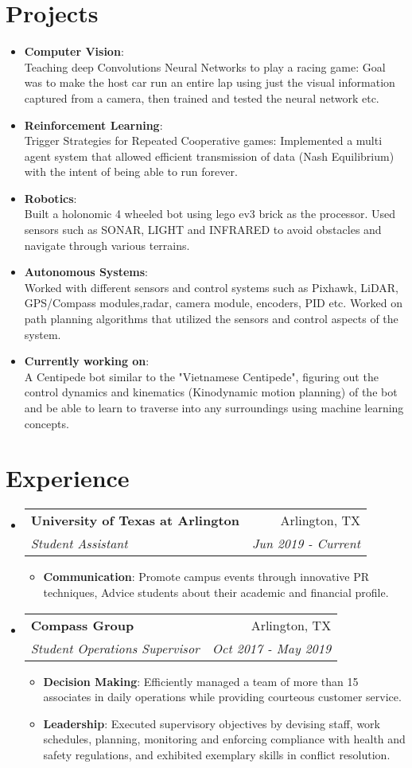 \documentclass[letterpaper,11pt]{article}
\makeatletter
\newcommand{\resumeItem}[2]{
  \item\small{
    \textbf{#1}{: #2 \vspace{-2pt}}
  }
}
\newcommand{\resumeSubheading}[4]{
  \vspace{-1pt}\item
    \begin{tabular*}{0.97\textwidth}{l@{\extracolsep{\fill}}r}
      \textbf{#1} & #2 \\
      \textit{\small#3} & \textit{\small #4} \\
    \end{tabular*}\vspace{-5pt}
}
\newcommand{\resumeSubItem}[2]{\resumeItem{#1}{#2}\vspace{-4pt}}
\newcommand{\resumeSubHeadingListStart}{\begin{itemize}[leftmargin=*]}
\newcommand{\resumeSubHeadingListEnd}{\end{itemize}}
\newcommand{\resumeItemListStart}{\begin{itemize}}
\newcommand{\resumeItemListEnd}{\end{itemize}\vspace{-5pt}}
\makeatother
\begin{document}
\section{Projects}
  \resumeSubHeadingListStart
    \resumeSubItem{Computer Vision}
      {\\Teaching deep Convolutions Neural Networks to play a racing game: Goal was to make the host car run an entire lap using just the visual information captured from a camera, then trained and tested the neural network etc.}
    \resumeSubItem{Reinforcement Learning}
      {\\Trigger Strategies for Repeated Cooperative games: Implemented a multi agent system that allowed efficient transmission of data (Nash Equilibrium) with the intent of being able to run forever.}
    \resumeSubItem{Robotics}
      {\\Built a holonomic 4 wheeled bot using lego ev3 brick as the processor. Used sensors such as SONAR, LIGHT and INFRARED to avoid obstacles and navigate through various terrains.}
    \resumeSubItem{Autonomous Systems}
      {\\Worked with different sensors and control systems such as Pixhawk, LiDAR, GPS/Compass modules,radar, camera module, encoders, PID etc. Worked on path planning algorithms that utilized the sensors and control aspects of the system.}
    \resumeSubItem{Currently working on}
      {\\A Centipede bot similar to the "Vietnamese Centipede", figuring out the control dynamics and kinematics (Kinodynamic motion planning) of the bot and be able to learn to traverse into any surroundings using machine learning concepts.}
  \resumeSubHeadingListEnd






\section{Experience}

  \resumeSubHeadingListStart
    \resumeSubheading
      {University of Texas at Arlington}{Arlington, TX}
      {Student Assistant}{Jun 2019 - Current}
      \resumeItemListStart
      \resumeItem{Communication}
          {Promote campus events through innovative PR techniques, Advice students about their academic and financial profile.}
      \resumeItemListEnd

    \resumeSubheading
      {Compass Group}{Arlington, TX}
      {Student Operations Supervisor}{Oct 2017 - May 2019}
      \resumeItemListStart
      \resumeItem{Decision Making}
          {Efficiently managed a team of more than 15 associates in daily operations while providing courteous customer service.}
        \resumeItem{Leadership}
          {Executed supervisory objectives by devising staff, work schedules, planning, monitoring and enforcing compliance with health and safety regulations, and exhibited exemplary skills in conflict resolution.}
      \resumeItemListEnd
  \resumeSubHeadingListEnd
  
\end{document}
